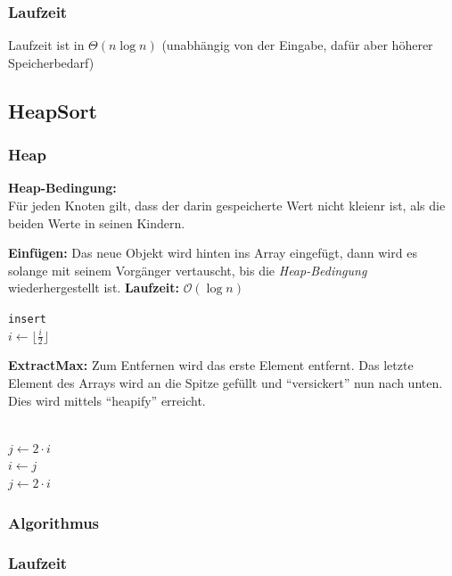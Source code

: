 \documentclass{scrartcl}
\begin{document}
\subsubsection{Laufzeit}
Laufzeit ist in $\Theta(n\log n)$ {\tiny (unabhängig von der Eingabe, dafür aber höherer Speicherbedarf)}

\subsection{HeapSort}
\subsubsection{Heap}
\begin{shaded}
\textbf{Heap-Bedingung:} \\ Für jeden Knoten gilt, dass der darin gespeicherte Wert nicht kleienr ist, als die beiden Werte in seinen Kindern.
\end{shaded}
\centerline{}

\textbf{Einfügen:} Das neue Objekt wird hinten ins Array eingefügt, dann wird es solange mit seinem Vorgänger vertauscht, bis die \emph{Heap-Bedingung} wiederhergestellt ist. \textbf{Laufzeit:} $\mathcal{O}(\log n)$
\begin{algorithmic}
\STATE \texttt{insert}
 \\
	{$i \gets \lfloor\frac{i}{2}\rfloor$}
\ENDWHILE
{}
\end{algorithmic}

\textbf{ExtractMax:} Zum Entfernen wird das erste Element entfernt. Das letzte Element des Arrays wird an die Spitze gefüllt und "`versickert"' nun nach unten. Dies wird mittels "`heapify"' erreicht.

\begin{algorithmic}
 \\ {$j\gets 2\cdot i$}
\STATE {}
	\STATE %
	\ENDIF
	 \\
		{$i \gets j$} \\
		{$j \gets 2\cdot i$}
	\ELSE
	\ENDIF
\ENDWHILE
{}
\end{algorithmic}


\subsubsection{Algorithmus}
\subsubsection{Laufzeit}
\end{document}
